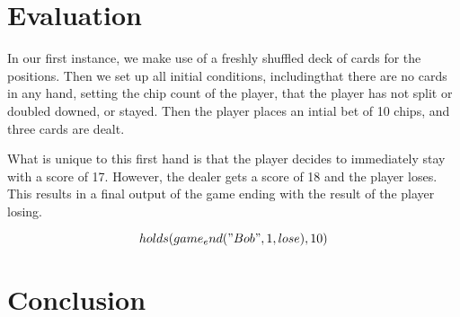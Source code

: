 \documentclass{article}
\begin{document}
\section{Evaluation}

In our first instance, we make use of a freshly shuffled deck of cards for the positions.
Then we set up all initial conditions, includingthat there are no cards in any hand,
setting the chip count of the player, that the player has not split or doubled downed, or stayed.
Then the player places an intial bet of 10 chips, and three cards are dealt.

What is unique to this first hand is that the player decides to immediately stay with a score of 17.
However, the dealer gets a score of 18 and the player loses.
This results in a final output of the game ending with the result of the player losing.

\begin{equation}
    holds(game_end("Bob",1,lose),10)
\end{equation}



\section{Conclusion}

\newpage


\end{document}
